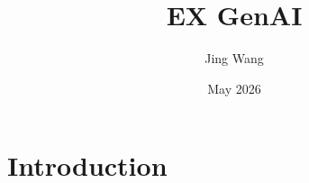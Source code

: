 \documentclass{article}
\title{EX GenAI}
\author{Jing Wang}
\date{May 2026}
\begin{document}
\maketitle

\section{Introduction}
\end{document}
